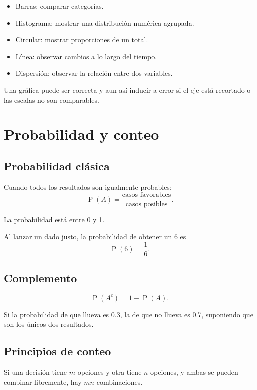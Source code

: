 \documentclass[10pt,oneside]{book}
\newcommand{\Prob}{\operatorname{P}}
\begin{document}
	\begin{itemize}
		\item Barras: comparar categorías.
		\item Histograma: mostrar una distribución numérica agrupada.
		\item Circular: mostrar proporciones de un total.
		\item Línea: observar cambios a lo largo del tiempo.
		\item Dispersión: observar la relación entre dos variables.
	\end{itemize}
	
	Una gráfica puede ser correcta y aun así inducir a error si
	el eje está recortado o las escalas no son comparables.
	
	\chapter{Probabilidad y conteo}
	
	\section{Probabilidad clásica}
	
	Cuando todos los resultados son igualmente probables:
	\[
	\Prob(A)=\frac{\text{casos favorables}}{\text{casos posibles}}.
	\]
	
	La probabilidad está entre 0 y 1.
	
	\begin{ejemplo}
		Al lanzar un dado justo, la probabilidad de obtener un 6 es
		\[
		\Prob(6)=\frac16.
		\]
	\end{ejemplo}
	
	\section{Complemento}
	
	\[
	\Prob(A^c)=1-\Prob(A).
	\]
	
	Si la probabilidad de que llueva es 0.3, la de que no llueva
	es 0.7, suponiendo que son los únicos dos resultados.
	
	\section{Principios de conteo}
	
	Si una decisión tiene $m$ opciones y otra tiene $n$ opciones,
	y ambas se pueden combinar libremente, hay $mn$ combinaciones.
	
\end{document}
